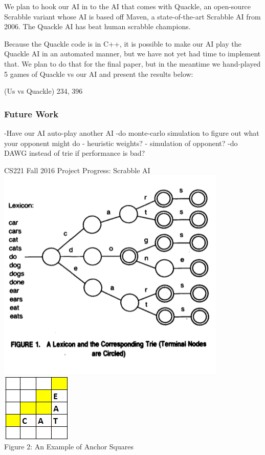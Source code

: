 \documentclass[12pt]{article}
\begin{document}
We plan to hook our AI in to the AI that comes with Quackle, an
open-source Scrabble variant whose AI is based off Maven, a
state-of-the-art Scrabble AI from 2006. The Quackle AI has beat human
scrabble champions.

Because the Quackle code is in C++, it is possible to make our AI play
the Quackle AI in an automated manner, but we have not yet had time to
implement that. We plan to do that for the final paper, but in the
meantime we hand-played 5 games of Quackle vs our AI and present the
results below:

(Us vs Quackle)
234, 396


\subsubsection*{Future Work}
-Have our AI auto-play another AI
-do monte-carlo simulation to figure out what your opponent might do
- heuristic weights?
- simulation of opponent? 
-do DAWG instead of trie if performance is bad?

\begin{center}
{\Large CS221 Fall 2016 Project Progress: Scrabble AI} \\

\includegraphics{trie}\\
\includegraphics{anchorexample}\\
Figure 2: An Example of Anchor Squares
\end{center}
\end{document}
